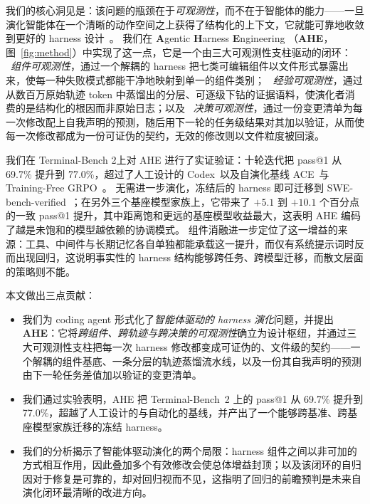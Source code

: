 
我们的核心洞见是：该问题的瓶颈在于\emph{可观测性}，而不在于智能体的能力——一旦演化智能体在一个清晰的动作空间之上获得了结构化的上下文，它就能可靠地收敛到更好的 harness 设计~\citep{suttonBitterLesson2019,zunicBitterLessonAgent2026}。
我们在 \textbf{A}gentic \textbf{H}arness \textbf{E}ngineering
（\textbf{AHE}，图~\ref{fig:method}）中实现了这一点，它是一个由三大可观测性支柱驱动的闭环：
~\emph{组件可观测性}，通过一个解耦的 harness 把七类可编辑组件以文件形式暴露出来，使每一种失败模式都能干净地映射到单一的组件类别；
~\emph{经验可观测性}，通过从数百万原始轨迹 token 中蒸馏出的分层、可逐级下钻的证据语料，使演化者消费的是结构化的根因而非原始日志；以及
~\emph{决策可观测性}，通过一份变更清单为每一次修改配上自我声明的预测，随后用下一轮的任务级结果对其加以验证，从而使每一次修改都成为一份可证伪的契约，无效的修改则以文件粒度被回滚。


我们在 Terminal-Bench 2\citep{merrillTerminalBenchBenchmarkingAgents2026a}上对 AHE 进行了实证验证：十轮迭代把 pass@1 从 69.7\% 提升到 77.0\%，超过了人工设计的 Codex~\citep{openaiCodexCLI2025}以及自演化基线 ACE~\citep{zhangAgenticContextEngineering2025a}与 Training-Free GRPO~\citep{caiTrainingFreeGroupRelative2025}。
无需进一步演化，冻结后的 harness 即可迁移到 SWE-bench-verified~\citep{jimenezSWEbenchCanLanguage2023}；在另外三个基座模型家族上，它带来了 $+5.1$ 到 $+10.1$ 个百分点的一致 pass@1 提升，其中距离饱和更远的基座模型收益最大，这表明 AHE 编码了越是未饱和的模型越依赖的协调模式。
组件消融进一步定位了这一增益的来源：工具、中间件与长期记忆各自单独都能承载这一提升，而仅有系统提示词时反而出现回归，这说明事实性的 harness 结构能够跨任务、跨模型迁移，而散文层面的策略则不能。

本文做出三点贡献：
\begin{itemize}
    \item 我们为 coding agent 形式化了\emph{智能体驱动的 harness 演化}问题，并提出 \textbf{AHE}：它将\emph{跨组件、跨轨迹与跨决策的可观测性}确立为设计枢纽，并通过三大可观测性支柱把每一次 harness 修改都变成可证伪的、文件级的契约——一个解耦的组件基底、一条分层的轨迹蒸馏流水线，以及一份其自我声明的预测由下一轮任务差值加以验证的变更清单。
    \item 我们通过实验表明，AHE 把 Terminal-Bench~2 上的 pass@1 从 69.7\% 提升到 77.0\%，超越了人工设计的与自动化的基线，并产出了一个能够跨基准、跨基座模型家族迁移的冻结 harness。
    \item 我们的分析揭示了智能体驱动演化的两个局限：harness 组件之间以非可加的方式相互作用，因此叠加多个有效修改会使总体增益封顶；以及该闭环的自归因对于修复是可靠的，却对回归视而不见，这指明了回归的前瞻预判是未来自演化闭环最清晰的改进方向。
\end{itemize}

